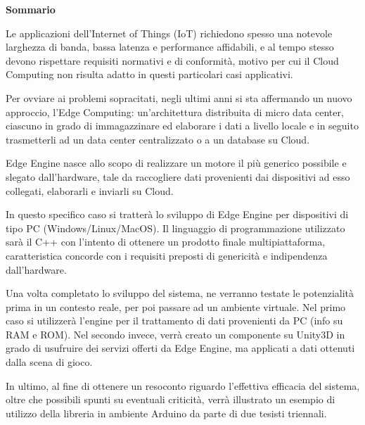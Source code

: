 \clearpage
\renewcommand{\headrulewidth}{0pt}
\begin{center}
	\huge{\textbf{Sommario}}
\end{center}
\null{}

\begin{spacing}{1.25}
	
Le applicazioni dell'Internet of Things (IoT) richiedono spesso una notevole larghezza di banda, bassa latenza e performance affidabili, e al tempo stesso devono rispettare requisiti normativi e di conformità, motivo per cui il Cloud Computing non risulta adatto in questi particolari casi applicativi.

Per ovviare ai problemi sopracitati, negli ultimi anni si sta affermando un nuovo approccio, l'Edge Computing: un’architettura distribuita di micro data center, ciascuno in grado di immagazzinare ed elaborare i dati a livello locale e in seguito trasmetterli ad un data center centralizzato o a un database su Cloud.

Edge Engine nasce allo scopo di realizzare un motore il più generico possibile e slegato dall'hardware, tale da raccogliere dati provenienti dai dispositivi ad esso collegati, elaborarli e inviarli su Cloud.

In questo specifico caso si tratterà lo sviluppo di Edge Engine per dispositivi di tipo PC (Windows/Linux/MacOS). Il linguaggio di programmazione utilizzato sarà il C++ con l'intento di ottenere un prodotto finale multipiattaforma, caratteristica concorde con i requisiti preposti di genericità e indipendenza dall'hardware.

Una volta completato lo sviluppo del sistema, ne verranno testate le potenzialità prima in un contesto reale, per poi passare ad un ambiente virtuale. Nel primo caso si utilizzerà l'engine per il trattamento di dati provenienti da PC (info su RAM e ROM). Nel secondo invece, verrà creato un componente su Unity3D in grado di usufruire dei servizi offerti da Edge Engine, ma applicati a dati ottenuti dalla scena di gioco.

In ultimo, al fine di ottenere un resoconto riguardo l'effettiva efficacia del sistema, oltre che possibili spunti su eventuali criticità, verrà illustrato un esempio di utilizzo della libreria in ambiente Arduino da parte di due tesisti triennali.
\end{spacing}
\null{}
\clearpage
\renewcommand{\headrulewidth}{0.5pt}

